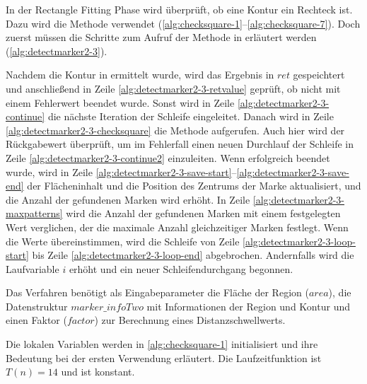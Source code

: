 In der Rectangle Fitting Phase wird überprüft, ob eine Kontur ein Rechteck ist. Dazu wird die Methode
  verwendet (\autoref{alg:checksquare-1}--\autoref{alg:checksquare-7}). Doch zuerst müssen die
 Schritte zum Aufruf der Methode in  erläutert werden
 (\autoref{alg:detectmarker2-3}).

Nachdem die Kontur in  ermittelt wurde, wird das Ergebnis in $\mathit{ret}$ gespeichtert und
 anschließend in Zeile \ref{alg:detectmarker2-3-retvalue} geprüft, ob  nicht mit einem
 Fehlerwert beendet wurde. Sonst wird in Zeile \ref{alg:detectmarker2-3-continue} die nächste Iteration der Schleife
 eingeleitet. Danach wird in Zeile \ref{alg:detectmarker2-3-checksquare} die Methode  aufgerufen.
 Auch hier wird der Rückgabewert überprüft, um im Fehlerfall einen neuen Durchlauf der Schleife in Zeile
 \ref{alg:detectmarker2-3-continue2} einzuleiten. Wenn  erfolgreich beendet wurde, wird in Zeile
 \ref{alg:detectmarker2-3-save-start}--\ref{alg:detectmarker2-3-save-end} der Flächeninhalt und die Position des
 Zentrums der Marke aktualisiert, und die Anzahl der gefundenen Marken wird erhöht. In Zeile
 \ref{alg:detectmarker2-3-maxpatterns} wird die Anzahl der gefundenen Marken mit einem festgelegten Wert verglichen, der
 die maximale Anzahl gleichzeitiger Marken festlegt. Wenn die Werte übereinstimmen, wird die Schleife von Zeile
 \ref{alg:detectmarker2-3-loop-start} bis Zeile \ref{alg:detectmarker2-3-loop-end} abgebrochen. Andernfalls wird die
 Laufvariable $i$ erhöht und ein neuer Schleifendurchgang begonnen.

Das Verfahren  benötigt als Eingabeparameter die Fläche der Region ($\mathit{area}$), die
 Datenstruktur $\mathit{marker\_infoTwo}$ mit Informationen der Region und Kontur und einen Faktor ($\mathit{factor}$)
 zur Berechnung eines Distanzschwellwerts.

Die lokalen Variablen werden in \autoref{alg:checksquare-1} initialisiert und ihre Bedeutung bei der ersten Verwendung erläutert. Die Laufzeitfunktion ist $T(n) = 14$ und ist konstant.

